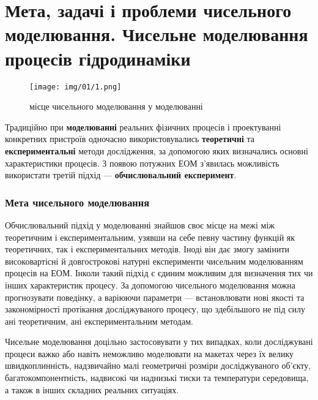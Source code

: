 \section{Мета, задачі і проблеми чисельного моделювання. Чисельне моделювання процесів гідродинаміки} 


\begin{figure}[H]
    \centering
    \texttt{[image: img/01/1.png]}
    \caption{місце чисельного моделювання у моделюванні}
\end{figure}

Традиційно при \textbf{моделюванні} реальних фізичних процесів і проектуванні конкретних пристроїв одночасно використовувались \textbf{теоретичні} та \textbf{експериментальні} методи дослідження, за допомогою яких визначались основні характеристики процесів. З появою потужних ЕОМ з'явилась можливість використати третій підхід --- \textbf{обчислювальний експеримент}.

\subsubsection{Мета чисельного моделювання}

Обчислювальний підхід у моделюванні знайшов своє місце на межі між теоретичним і експериментальним, узявши на себе певну частину функцій як теоретичних, так і експериментальних методів. Іноді він дає змогу замінити високовартісні й довгострокові натурні експерименти чисельним моделюванням процесів на ЕОМ. Інколи такий підхід є єдиним можливим для визначення тих чи інших характеристик процесу. За допомогою чисельного моделювання можна прогнозувати поведінку, а варіюючи параметри --- встановлювати нові якості та закономірності протікання досліджуваного процесу, що здебільшого не під силу ані теоретичним, ані експериментальним методам.

\begin{example}
    Чисельне моделювання доцільно застосовувати у тих випадках, коли досліджувані процеси важко або навіть неможливо моделювати на макетах через їх велику швидкоплинність, надзвичайно малі геометричні розміри досліджуваного об'єкту, багатокомпонентність, надвисокі чи наднизькі тиски та температури середовища, а також в інших складних реальних ситуаціях.
\end{example}

